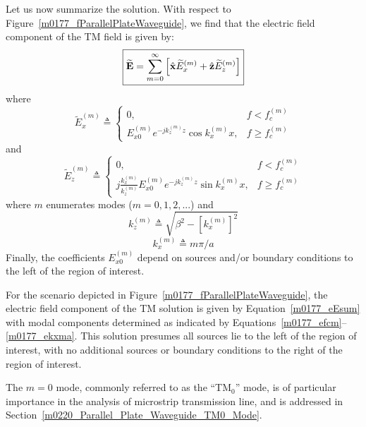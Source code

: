 Let us now summarize the solution.
With respect to Figure~\ref{m0177_fParallelPlateWaveguide}, we find that the electric field component of the TM field is given by:
%
\begin{equation}
\boxed{
\widetilde{\bf E} = \sum_{m=0}^{\infty} \left[ \hat{\bf x} \widetilde{E}_x^{(m)} + \hat{\bf z} \widetilde{E}_z^{(m)} \right]
}
\label{m0177_eEsum}
\end{equation}
%
where
%
\begin{equation}
\boxed{
\widetilde{E}_x^{(m)} \triangleq \begin{cases}
                                   0,                             & f<f_c^{(m)} \\
                                   E_{x0}^{(m)} e^{-jk_z^{(m)} z} \cos k_x^{(m)} x, & f\ge f_c^{(m)} 
                                 \end{cases}
}
\end{equation}
%
and
%
\begin{equation}
\boxed{
\widetilde{E}_z^{(m)} \triangleq \begin{cases}
                                   0,                             & f<f_c^{(m)} \\
                                   j\frac{k_x^{(m)}}{k_z^{(m)}}E_{x0}^{(m)} e^{-jk_z^{(m)} z} \sin k_x^{(m)} x, & f\ge f_c^{(m)} 
                                 \end{cases}
}
\end{equation}
%
where $m$ enumerates modes ($m=0,1,2,...$) and
%
\begin{equation}
\boxed{
k_z^{(m)} \triangleq \sqrt{\beta^2-\left[k_x^{(m)}\right]^2} 
}
\end{equation}
%
\begin{equation}
\boxed{
k_x^{(m)} \triangleq m\pi/a 
}
\label{m0177_ekxma}
\end{equation}
%
Finally, the coefficients $E_{x0}^{(m)}$ depend on sources and/or boundary conditions to the left of the region of interest.

\begin{mdframed}[backgroundcolor=yellow!20,nobreak=true] 
For the scenario depicted in Figure~\ref{m0177_fParallelPlateWaveguide}, the electric field component of the TM solution is given by Equation~\ref{m0177_eEsum} with modal components determined as indicated by Equations~\ref{m0177_efcm}--\ref{m0177_ekxma}.  This solution presumes all sources lie to the left of the region of interest, with no additional sources or boundary conditions to the right of the region of interest.
\end{mdframed}
  
The $m=0$ mode, commonly referred to as the ``TM$_0$'' mode, is of particular importance in the analysis of microstrip transmission line, and is addressed in Section~\ref{m0220_Parallel_Plate_Waveguide_TM0_Mode}.



